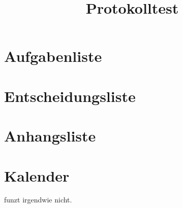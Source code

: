 \documentclass[ngerman]{scrartcl}
\title{Protokolltest}
\begin{document}
	\maketitle
	\tableofcontents

	\section*{Aufgabenliste}
	\listoftasks

	\section*{Entscheidungsliste}
	\listofdecisions

	\section*{Anhangsliste}
	\listofattachments

	\section*{Kalender}

	funzt irgendwie nicht.

\end{document}

